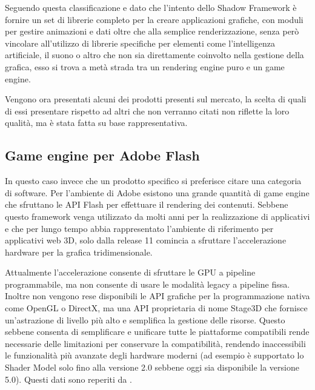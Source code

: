 Seguendo questa classificazione e dato che l'intento dello Shadow Framework \`e fornire un set di librerie completo per la creare applicazioni grafiche, con moduli per gestire animazioni e dati oltre che alla semplice renderizzazione, senza per\`o vincolare all'utilizzo di librerie specifiche per elementi come l'intelligenza artificiale, il suono o altro che non sia direttamente coinvolto nella gestione della grafica, esso si trova a met\`a strada tra un rendering engine puro e un game engine.

Vengono ora presentati alcuni dei prodotti presenti sul mercato, la scelta di quali di essi presentare rispetto ad altri che non verranno citati non riflette la loro qualit\`a, ma \`e stata fatta su base rappresentativa.

\subsection{Game engine per Adobe Flash}
In questo caso invece che un prodotto specifico si preferisce citare una categoria di software. Per l'ambiente di Adobe esistono una grande quantit\`a di game engine che sfruttano le \ac{API} Flash per effettuare il rendering dei contenuti. Sebbene questo framework venga utilizzato da molti anni per la realizzazione di applicativi e che per lungo tempo abbia rappresentato l'ambiente di riferimento per applicativi web 3D, solo dalla release 11 comincia a sfruttare l'accelerazione hardware per la grafica tridimensionale.

Attualmente l'accelerazione consente di sfruttare le GPU a pipeline programmabile, ma non consente di usare le modalit\`a legacy a pipeline fissa. 
Inoltre non vengono rese disponibili le \ac{API} grafiche per la programmazione nativa come OpenGL o DirectX, ma una \ac{API} proprietaria di nome Stage3D che fornisce un'astrazione di livello pi\`u alto e semplifica la gestione delle risorse.
Questo sebbene consenta di semplificare e unificare tutte le piattaforme compatibili rende necessarie delle limitazioni per conservare la compatibilit\`a, rendendo inaccessibili le funzionalit\`a pi\`u avanzate degli hardware moderni (ad esempio \`e supportato lo Shader Model solo fino alla versione 2.0 sebbene oggi sia disponibile la versione 5.0).
Questi dati sono reperiti da \cite{site:adobestage3d}.

